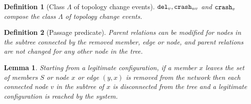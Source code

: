 \documentclass[11pt]{article}
\newtheorem{definition}{Definition}
\newtheorem{lemma}{Lemma}
\begin{document}
\begin{definition}[Class $\Lambda$ of topology change events]
 ${\tt del}_v, {\tt crash}_{uv}$ and ${\tt crash}_v$ compose the class
 $\Lambda$ of topology change events.
\end{definition}

\begin{definition}[Passage predicate]
\label{def:passage_predicate}
Parent relations can be modified for nodes in the subtree connected by
the removed member, edge or node, and parent relations are not changed
for any other node in the tree.
\end{definition}





\begin{lemma}
\label{lem:dyn_suppression}
Starting from a legitimate configuration, if a
member $x$ leaves the set of members $S$ or node $x$ or edge $(y,x)$
is removed from the network then each connected node $v$ in the
subtree of $x$ is disconnected from the tree and a legitimate
configuration is reached by the system.
\end{lemma}
\end{document}
